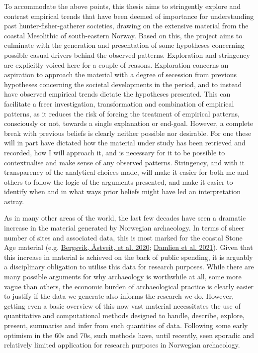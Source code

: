 \documentclass[
  a4paper,
  oneside]{uiophdthesis}
\begin{document}
To accommodate the above points, this thesis aims to stringently explore and contrast empirical trends that have been deemed of importance for understanding past hunter-fisher-gatherer societies, drawing on the extensive material from the coastal Mesolithic of south-eastern Norway. Based on this, the project aims to culminate with the generation and presentation of some hypotheses concerning possible casual drivers behind the observed patterns. Exploration and stringency are explicitly voiced here for a couple of reasons. Exploration concerns an aspiration to approach the material with a degree of secession from previous hypotheses concerning the societal developments in the period, and to instead have observed empirical trends dictate the hypotheses presented. This can facilitate a freer investigation, transformation and combination of empirical patterns, as it reduces the risk of forcing the treatment of empirical patterns, consciously or not, towards a single explanation or end-goal. However, a complete break with previous beliefs is clearly neither possible nor desirable. For one these will in part have dictated how the material under study has been retrieved and recorded, how I will approach it, and is necessary for it to be possible to contextualise and make sense of any observed patterns. Stringency, and with it transparency of the analytical choices made, will make it easier for both me and others to follow the logic of the arguments presented, and make it easier to identify when and in what ways prior beliefs might have led an interpretation astray.

As in many other areas of the world, the last few decades have seen a dramatic increase in the material generated by Norwegian archaeology. In terms of sheer number of sites and associated data, this is most marked for the coastal Stone Age material (e.g. \protect\hyperlink{ref-bergsvik2020}{Bergsvik, Åstveit, et al. 2020}; \protect\hyperlink{ref-damlien2021}{Damlien et al. 2021}). Given that this increase in material is achieved on the back of public spending, it is arguably a disciplinary obligation to utilise this data for research purposes. While there are many possible arguments for why archaeology is worthwhile at all, some more vague than others, the economic burden of archaeological practice is clearly easier to justify if the data we generate also informs the research we do. However, getting even a basic overview of this now vast material necessitates the use of quantitative and computational methods designed to handle, describe, explore, present, summarise and infer from such quantities of data. Following some early optimism in the 60s and 70s, such methods have, until recently, seen sporadic and relatively limited application for research purposes in Norwegian archaeology.
\end{document}
